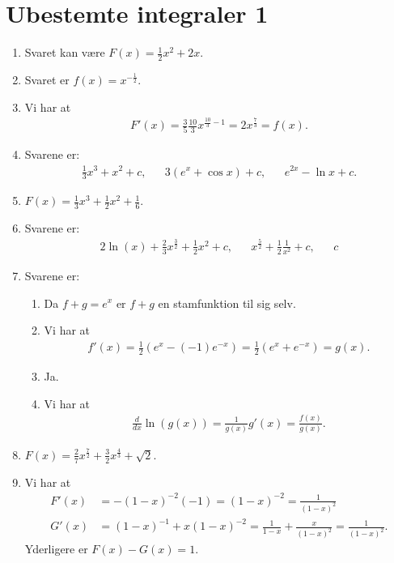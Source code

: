 \newpage
\section{Ubestemte integraler 1}

\begin{enumerate}
	\item Svaret kan være $F(x)=\frac{1}{2}x^2+2x$.
	
	\item Svaret er $f(x)= x^{-\frac{1}{2}}$.
	
	\item Vi har at
	\begin{align*}
	F'(x)=\frac{3}{5}\frac{10}{3}x^{\frac{10}{3}-1}=2x^{\frac{7}{3}}=f(x).
	\end{align*}
	
	
	\item Svarene er:
	\begin{align*}
	\frac{1}{3}x^3+x^2+c,&& 3(e^x+\cos x)+c,&& e^{2x}-\ln x+c.
	\end{align*}
	
	\item $F(x)=\frac{1}{3}x^3+\frac{1}{2}x^2+\frac{1}{6}$.
	
	\item Svarene er:
	\begin{align*}
	2\ln(x)+\frac{2}{3}x^{\frac{3}{2}}+\frac{1}{2}x^2+c,&& x^{\frac{5}{2}}+\frac{1}{2}\frac{1}{x^2} +c,&& c
	\end{align*}
	
	\item\label{it:int11ans} Svarene er:
	\begin{enumerate}
		\item Da $f+g=e^x$ er $f+g$ en stamfunktion til sig selv.
		\item Vi har at
		\begin{align*}
		f'(x)=\frac{1}{2}(e^x-(-1)e^{-x})=\frac{1}{2}(e^x+e^{-x})=g(x).
		\end{align*}
		\item Ja.
		\item Vi har at
		\begin{align*}
		\frac{d}{dx}\ln(g(x))=\frac{1}{g(x)}g'(x)=\frac{f(x)}{g(x)}.
		\end{align*}
	\end{enumerate}

	\item $F(x)=\frac{2}{7}x^{\frac{7}{2}}+\frac{3}{2}x^{\frac{4}{3}}+\sqrt{2}$.
	
	\item Vi har at 
	\begin{align*}
	F'(x)&=-(1-x)^{-2}(-1)=(1-x)^{-2}=\frac{1}{(1-x)^2}\\
	G'(x)&=(1-x)^{-1}+x(1-x)^{-2}=\frac{1}{1-x}+\frac{x}{(1-x)^2}=\frac{1}{(1-x)^2}.
	\end{align*}
	Yderligere er $F(x)-G(x)=1$.


\end{enumerate}
